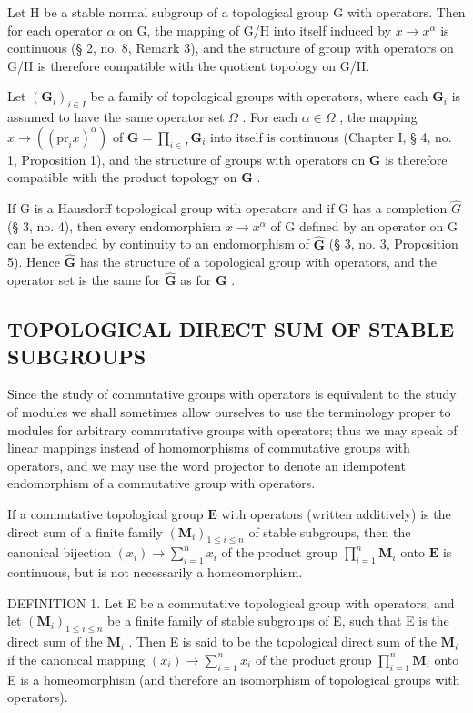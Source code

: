 Let H be a stable normal subgroup of a topological group G with operators. Then for each operator \(\alpha\) on G, the mapping of G/H into itself induced by \(x \rightarrow x^{\alpha}\) is continuous (§ 2, no. 8, Remark 3), and the structure of group with operators on G/H is therefore compatible with the quotient topology on G/H.

Let \((\mathbf{G}_i)_{i\in I}\) be a family of topological groups with operators, where each \(\mathbf{G}_i\) is assumed to have the same operator set \(\Omega\) . For each \(\alpha \in \Omega\) , the mapping \(x\to ((\mathrm{pr}_i x)^{\alpha})\) of \(\mathbf{G} = \prod_{i\in I}\mathbf{G}_i\) into itself is continuous (Chapter I, § 4, no. 1, Proposition 1), and the structure of groups with operators on \(\mathbf{G}\) is therefore compatible with the product topology on \(\mathbf{G}\) .

If G is a Hausdorff topological group with operators and if G has a completion \(\hat{G}\) (§ 3, no. 4), then every endomorphism \(x \to x^{\alpha}\) of G defined by an operator on G can be extended by continuity to an endomorphism of \(\hat{\mathbf{G}}\) (§ 3, no. 3, Proposition 5). Hence \(\hat{\mathbf{G}}\) has the structure of a topological group with operators, and the operator set is the same for \(\hat{\mathbf{G}}\) as for \(\mathbf{G}\) .

\subsection{TOPOLOGICAL DIRECT SUM OF STABLE SUBGROUPS}

Since the study of commutative groups with operators is equivalent to the study of modules we shall sometimes allow ourselves to use the terminology proper to modules for arbitrary commutative groups with operators; thus we may speak of linear mappings instead of homomorphisms of commutative groups with operators, and we may use the word projector to denote an idempotent endomorphism of a commutative group with operators.

If a commutative topological group \(\mathbf{E}\) with operators (written additively) is the direct sum of a finite family \((\mathbf{M}_i)_{1 \leqslant i \leqslant n}\) of stable subgroups, then the canonical bijection \((x_i) \to \sum_{i=1}^{n} x_i\) of the product group \(\prod_{i=1}^{n} \mathbf{M}_i\) onto \(\mathbf{E}\) is continuous, but is not necessarily a homeomorphism.

DEFINITION 1. Let E be a commutative topological group with operators, and let \((\mathbf{M}_i)_{1 \leqslant i \leqslant n}\) be a finite family of stable subgroups of E, such that E is the direct sum of the \(\mathbf{M}_i\) . Then E is said to be the topological direct sum of the \(\mathbf{M}_i\) if the canonical mapping \((x_i) \to \sum_{i=1}^{n} x_i\) of the product group \(\prod_{i=1}^{n} \mathbf{M}_i\) onto E is a homeomorphism (and therefore an isomorphism of topological groups with operators).

